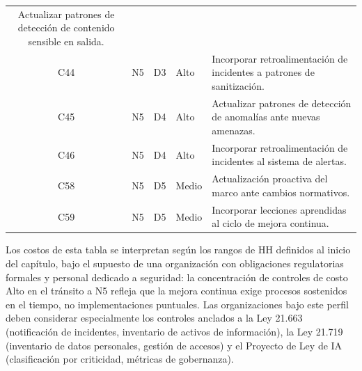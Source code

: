 \begin{table}[H]
\begin{tabularx}{\textwidth}{@{} c c c l X @{}}
    Actualizar patrones de detección de contenido sensible en salida. \\
  C44 & N5 & D3     & Alto &
    Incorporar retroalimentación de incidentes a patrones de sanitización. \\
  C45 & N5 & D4     & Alto &
    Actualizar patrones de detección de anomalías ante nuevas amenazas. \\
  C46 & N5 & D4     & Alto &
    Incorporar retroalimentación de incidentes al sistema de alertas. \\
  C58 & N5 & D5     & Medio &
    Actualización proactiva del marco ante cambios normativos. \\
  C59 & N5 & D5     & Medio &
    Incorporar lecciones aprendidas al ciclo de mejora continua. \\
  \bottomrule
\end{tabularx}
\end{table}

\begin{infobox}
  Los costos de esta tabla se interpretan según los rangos de HH definidos al inicio
  del capítulo, bajo el supuesto de una organización con obligaciones regulatorias
  formales y personal dedicado a seguridad: la concentración de controles de costo
  Alto en el tránsito a N5 refleja que la mejora continua exige procesos sostenidos
  en el tiempo, no implementaciones puntuales. Las organizaciones bajo este perfil
  deben considerar especialmente los controles anclados a la Ley 21.663 (notificación
  de incidentes, inventario de activos de información), la Ley 21.719 (inventario de
  datos personales, gestión de accesos) y el Proyecto de Ley de IA (clasificación por
  criticidad, métricas de gobernanza).
\end{infobox}